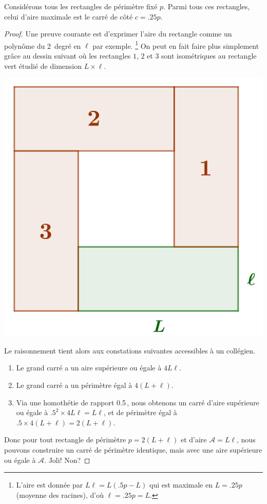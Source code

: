 \begin{fact}
	Considérons tous les rectangles de périmètre fixé $p$. Parmi tous ces rectangles, celui d'aire maximale est le carré de côté $c = \num{.25} p$.
\end{fact}


\begin{proof}
	Une preuve courante est d'exprimer l'aire du rectangle comme un polynôme du 2\ieme\ degré en $\ell$ par exemple.%
	\footnote{
		L'aire est donnée par $L \ell = L (\num{.5} p - L)$ qui est maximale en $L = \num{.25} p$ (moyenne des racines), d'où $\ell = \num{.25} p = L$.
	}
	On peut en fait faire plus simplement grâce au dessin suivant où les rectangles $1$, $2$ et $3$ sont isométriques au rectangle vert étudié de dimension $L \times \ell$.

	\begin{center}
		\includegraphics[scale=.4]{content/rectangle/rectangle.png}
	\end{center}
	
	Le raisonnement tient alors aux constations suivantes accessibles à un collégien.
	\begin{enumerate}
		\item Le grand carré a un aire supérieure ou égale à $4 L \ell$.

		\item Le grand carré a un périmètre égal à $4 (L + \ell)$.

		\item Via une homothétie de rapport \num{.5}\,, nous obtenons un carré d'aire supérieure ou égale à $\num{.5}^2 \times 4 L \ell =  L \ell$, et de périmètre égal à $\num{.5} \times 4 (L + \ell) = 2 (L + \ell)$.
	\end{enumerate}
	
	Donc pour tout rectangle de périmètre $p = 2 (L + \ell)$ et d'aire $\mathscr{A} = L \ell$, nous pouvons construire un carré de périmètre identique, mais avec une aire supérieure ou égale à $\mathscr{A}$. Joli! Non?
\end{proof}


